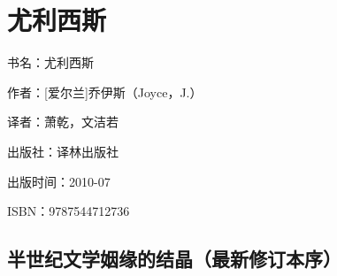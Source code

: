 


\section{尤利西斯}

\par 书名：尤利西斯
\par 作者：[爱尔兰]乔伊斯（Joyce，J.）
\par 译者：萧乾，文洁若
\par 出版社：译林出版社
\par 出版时间：2010-07
\par ISBN：9787544712736


\subsection*{半世纪文学姻缘的结晶（最新修订本序）}

